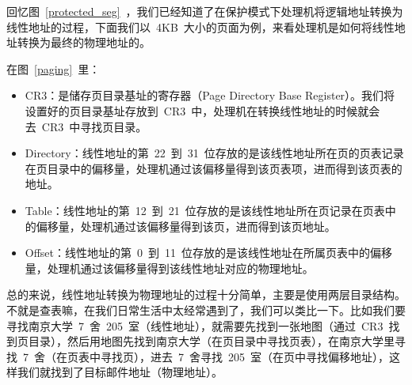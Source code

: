 回忆图~\ref{protected_seg}~，我们已经知道了在保护模式下处理机将逻辑地址转换为线性地址的过程，下面我们以~4KB~大小的页面为例，来看处理机是如何将线性地址转换为最终的物理地址的。


在图~\ref{paging}~里：
\begin{itemize}
\item CR3：是储存页目录基址的寄存器（Page Directory Base Register）。我们将设置好的页目录基址存放到~CR3~中，处理机在转换线性地址的时候就会去~CR3~中寻找页目录。
\item Directory：线性地址的第~22~到~31~位存放的是该线性地址所在页的页表记录在页目录中的偏移量，处理机通过该偏移量得到该页表项，进而得到该页表的地址。
\item Table：线性地址的第~12~到~21~位存放的是该线性地址所在页记录在页表中的偏移量，处理机通过该偏移量得到该页，进而得到该页地址。
\item Offset：线性地址的第~0~到~11~位存放的是该线性地址在所属页表中的偏移量，处理机通过该偏移量得到该线性地址对应的物理地址。
\end{itemize}

总的来说，线性地址转换为物理地址的过程十分简单，主要是使用两层目录结构。不就是查表嘛，在我们日常生活中太经常遇到了，我们可以类比一下。比如我们要寻找南京大学~7~舍~205~室（线性地址），就需要先找到一张地图（通过~CR3~找到页目录），然后用地图先找到南京大学（在页目录中寻找页表），在南京大学里寻找~7~舍（在页表中寻找页），进去~7~舍寻找~205~室（在页中寻找偏移地址），这样我们就找到了目标邮件地址（物理地址）。


